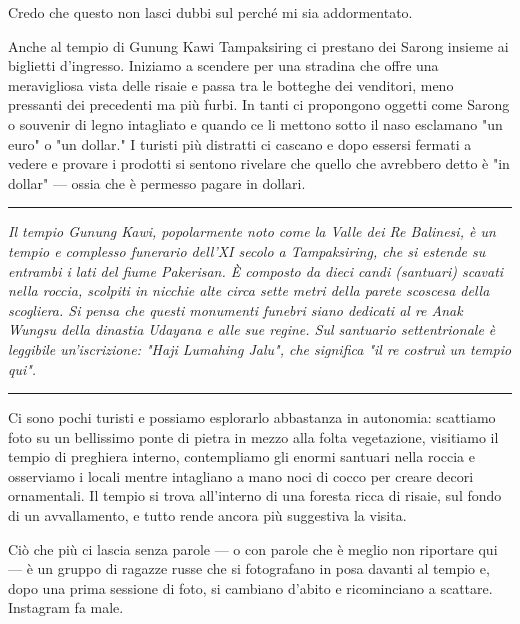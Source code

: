 Credo che questo non lasci dubbi sul perché mi sia addormentato.

Anche al tempio di Gunung Kawi Tampaksiring ci prestano dei Sarong insieme ai biglietti d'ingresso. Iniziamo a scendere per una stradina che offre una meravigliosa vista delle risaie e passa tra le botteghe dei venditori, meno pressanti dei precedenti ma più furbi. In tanti ci propongono oggetti come Sarong o souvenir di legno intagliato e quando ce li mettono sotto il naso esclamano "un euro" o "un dollar." I turisti più distratti ci cascano e dopo essersi fermati a vedere e provare i prodotti si sentono rivelare che quello che avrebbero detto è "in dollar" — ossia che è permesso pagare in dollari.

\begin{center}
    \noindent\rule{0.6\textwidth}{0.4pt}
\end{center}

\textit{Il tempio Gunung Kawi, popolarmente noto come la Valle dei Re Balinesi, è un tempio e complesso funerario dell'XI secolo a Tampaksiring, che si estende su entrambi i lati del fiume Pakerisan. È composto da dieci candi (santuari) scavati nella roccia, scolpiti in nicchie alte circa sette metri della parete scoscesa della scogliera. Si pensa che questi monumenti funebri siano dedicati al re Anak Wungsu della dinastia Udayana e alle sue regine. Sul santuario settentrionale è leggibile un'iscrizione: "Haji Lumahing Jalu", che significa "il re costruì un tempio qui".}

\begin{center}
    \noindent\rule{0.6\textwidth}{0.4pt}
\end{center}

Ci sono pochi turisti e possiamo esplorarlo abbastanza in autonomia: scattiamo foto su un bellissimo ponte di pietra in mezzo alla folta vegetazione, visitiamo il tempio di preghiera interno, contempliamo gli enormi santuari nella roccia e osserviamo i locali mentre intagliano a mano noci di cocco per creare decori ornamentali. Il tempio si trova all'interno di una foresta ricca di risaie, sul fondo di un avvallamento, e tutto rende ancora più suggestiva la visita.

Ciò che più ci lascia senza parole — o con parole che è meglio non riportare qui — è un gruppo di ragazze russe che si fotografano in posa davanti al tempio e, dopo una prima sessione di foto, si cambiano d'abito e ricominciano a scattare. Instagram fa male.

